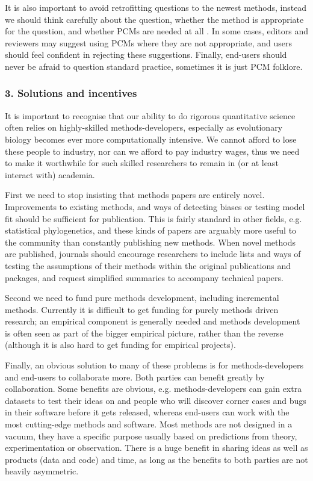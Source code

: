 \documentclass[a4paper,12pt]{article}
\begin{document}
    It is also important to avoid retrofitting questions to the newest methods, instead we should think carefully about the question, whether the method is appropriate for the question, and whether PCMs are needed at all \citep{westoby1995misinterpreting,losos2011seeing}.
    In some cases, editors and reviewers may suggest using PCMs where they are not appropriate, and users should feel confident in rejecting these suggestions.
    Finally, end-users should never be afraid to question standard practice, sometimes it is just PCM folklore.

  \subsubsection{3. Solutions and incentives}
    It is important to recognise that our ability to do rigorous quantitative science often relies on highly-skilled methods-developers, especially as evolutionary biology becomes ever more computationally intensive. 
    We cannot afford to lose these people to industry, nor can we afford to pay industry wages, thus we need to make it worthwhile for such skilled researchers to remain in (or at least interact with) academia.

    First we need to stop insisting that methods papers are entirely novel. 
    Improvements to existing methods, and ways of detecting biases or testing model fit should be sufficient for publication.
    This is fairly standard in other fields, e.g. statistical phylogenetics, and these kinds of papers are arguably more useful to the community than constantly publishing new methods.
    When novel methods are published, journals should encourage researchers to include lists and ways of testing the assumptions of their methods within the original publications and packages, and request simplified summaries to accompany technical papers.

    Second we need to fund pure methods development, including incremental methods. 
    Currently it is difficult to get funding for purely methods driven research; an empirical component is generally needed and methods development is often seen as part of the bigger empirical picture, rather than the reverse (although it is also hard to get funding for empirical projects). 

    Finally, an obvious solution to many of these problems is for methods-developers and end-users to collaborate more. 
    Both parties can benefit greatly by collaboration. 
    Some benefits are obvious, e.g. methods-developers can gain extra datasets to test their ideas on and people who will discover corner cases and bugs in their software before it gets released, whereas end-users can work with the most cutting-edge methods and software.  
    Most methods are not designed in a vacuum, they have a specific purpose usually based on predictions from theory, experimentation or observation.
    There is a huge benefit in sharing ideas as well as products (data and code) and time, as long as the benefits to both parties are not heavily asymmetric. 
\end{document}
